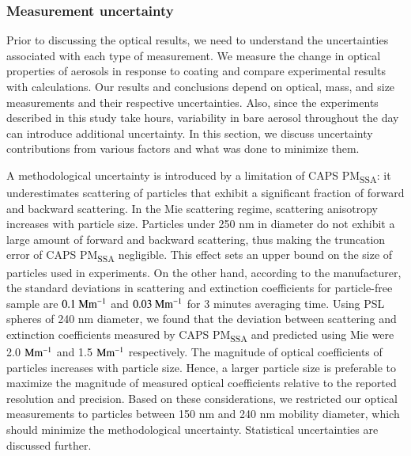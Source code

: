 \label{sec:optical}

\subsubsection{Measurement uncertainty}

\label{sec:uncertainty}

Prior to discussing the optical results, we need to understand the uncertainties associated with each type of measurement. We measure the change in optical properties of aerosols in response to coating and compare experimental results with calculations. Our results and conclusions depend on optical, mass, and size measurements and their respective uncertainties. Also, since the experiments described in this study take hours, variability in bare aerosol throughout the day can introduce additional uncertainty. In this section, we discuss uncertainty contributions from various factors and what was done to minimize them.

A methodological uncertainty is introduced by a limitation of CAPS PM\textsubscript{SSA}: it underestimates scattering of particles that exhibit a significant fraction of forward and backward scattering. In the Mie scattering regime, scattering anisotropy increases with particle size. Particles under 250 nm in diameter do not exhibit a large amount of forward and backward scattering, thus making the truncation error of CAPS PM\textsubscript{SSA} negligible. This effect sets an upper bound on the size of particles used in experiments.
On the other hand, according to the manufacturer, the standard deviations in scattering and extinction coefficients for particle-free sample are $0.1\rm\ Mm^{-1}$ and $0.03\rm\ Mm^{-1}$ for 3 minutes averaging time. Using PSL spheres of 240 nm diameter, we found that the deviation between scattering and extinction coefficients measured by CAPS PM\textsubscript{SSA} and predicted using Mie were 2.0 $\rm Mm^{-1}$ and 1.5 $\rm Mm^{-1}$ respectively.
The magnitude of optical coefficients of particles increases with particle size. Hence, a larger particle size is preferable to maximize the magnitude of measured optical coefficients relative to the reported resolution and precision. Based on these considerations, we restricted our optical measurements to particles between 150 nm and 240 nm mobility diameter, which should minimize the methodological uncertainty. Statistical uncertainties are discussed further.

